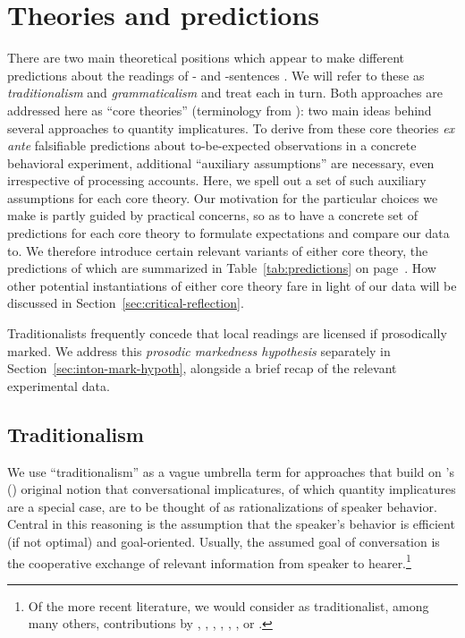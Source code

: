 \documentclass[fleqn,reqno,10pt]{article}
\newcommand{\as}{\acro{as}}
\renewcommand{\es}{\acro{es}}
\begin{document}
\section{Theories and predictions}
\label{sec:theories-predictions}

There are two main theoretical positions which appear to make
different predictions about the readings of \as- and \es-sentences
\citep[see][for
overview]{Horn2006:The-Border-Wars,Geurts2010:Quantity-Implic,Sauerland2012:The-Computation,ChemlaSingh2014:Remarks-on-the-}. We
will refer to these as \emph{traditionalism} and \emph{grammaticalism}
and treat each in turn. Both approaches are addressed here as ``core
theories'' (terminology from
\citeauthor{ChemlaSingh2014:Remarks-on-the-}): two main ideas behind
several approaches to quantity implicatures. To derive from these core theories
\emph{ex ante} falsifiable predictions about
to-be-expected observations in a concrete behavioral experiment,
additional ``auxiliary assumptions'' are necessary, even
irrespective of processing accounts. Here, we spell out a set of such
auxiliary assumptions for each core theory. Our motivation for the
particular choices we make is partly guided by practical concerns, so
as to have a concrete set of predictions for each core theory to
formulate expectations and compare our data to. We therefore introduce
certain relevant variants of either core theory, the predictions of
which are summarized in Table~\ref{tab:predictions} on
page~\pageref{tab:predictions}. How other potential instantiations of
either core theory fare in light of our data will be discussed in
Section~\ref{sec:critical-reflection}.

Traditionalists frequently concede that local readings are licensed if
prosodically marked. We address this \emph{prosodic markedness
  hypothesis} separately in Section~\ref{sec:inton-mark-hypoth},
alongside a brief recap of the relevant experimental data.

\subsection{Traditionalism}
\label{sec:traditionalism}

We use ``traditionalism'' as a vague umbrella term for approaches that
build on \citeauthor{Grice1975:Logic-and-Conve}'s
(\citeyear{Grice1975:Logic-and-Conve}) original notion that
conversational implicatures, of which quantity implicatures are a
special case, are to be thought of as rationalizations of speaker
behavior. Central in this reasoning is the assumption that the
speaker's behavior is efficient (if not optimal) and
goal-oriented. Usually, the assumed goal of conversation is the
cooperative exchange of relevant information from speaker to
hearer.\footnote{Of the more recent literature, we would consider as
  traditionalist, among many others, contributions by
  \citet{Spector2006:Scalar-Implicat},
  \citet{Sauerland2004:Scalar-Implicat},
  \citet{Russell2006:Against-Grammat},
  \citet{vanRooijSchulz:ExhaustiveInterpretation},
  \citet{Geurts2010:Quantity-Implic},
  \citet{Franke2011:Quantity-Implic}, or
  \citet{GoodmanStuhlmuller2013:Knowledge-and-I}.}
\end{document}
